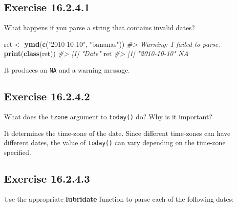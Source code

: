 \documentclass[]{book}
\newenvironment{Shaded}{\begin{snugshade}}{\end{snugshade}}
\newcommand{\CommentTok}[1]{\textcolor[rgb]{0.56,0.35,0.01}{\textit{#1}}}
\newcommand{\KeywordTok}[1]{\textcolor[rgb]{0.13,0.29,0.53}{\textbf{#1}}}
\newcommand{\NormalTok}[1]{#1}
\newcommand{\StringTok}[1]{\textcolor[rgb]{0.31,0.60,0.02}{#1}}
\theoremstyle{plain}
\theoremstyle{remark}
\begin{document}
\hypertarget{exercise-16.2.4.1}{%
\subsection*{\texorpdfstring{Exercise
{16.2.4.1}}{Exercise 16.2.4.1}}\label{exercise-16.2.4.1}}

What happens if you parse a string that contains invalid dates?

\begin{Shaded}
\begin{Highlighting}[]
\NormalTok{ret <-}\StringTok{ }\KeywordTok{ymd}\NormalTok{(}\KeywordTok{c}\NormalTok{(}\StringTok{"2010-10-10"}\NormalTok{, }\StringTok{"bananas"}\NormalTok{))}
\CommentTok{#> Warning: 1 failed to parse.}
\KeywordTok{print}\NormalTok{(}\KeywordTok{class}\NormalTok{(ret))}
\CommentTok{#> [1] "Date"}
\NormalTok{ret}
\CommentTok{#> [1] "2010-10-10" NA}
\end{Highlighting}
\end{Shaded}

It produces an \texttt{NA} and a warning message.

\hypertarget{exercise-16.2.4.2}{%
\subsection*{\texorpdfstring{Exercise
{16.2.4.2}}{Exercise 16.2.4.2}}\label{exercise-16.2.4.2}}

What does the \texttt{tzone} argument to \texttt{today()} do? Why is it
important?

It determines the time-zone of the date. Since different time-zones can
have different dates, the value of \texttt{today()} can vary depending
on the time-zone specified.

\hypertarget{exercise-16.2.4.3}{%
\subsection*{\texorpdfstring{Exercise
{16.2.4.3}}{Exercise 16.2.4.3}}\label{exercise-16.2.4.3}}

Use the appropriate \textbf{lubridate} function to parse each of the
following dates:
\end{document}
